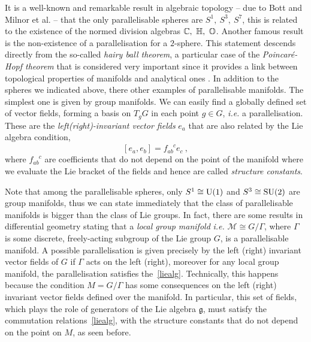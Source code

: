 \documentclass[debug]{phd}
\begin{document}
						It is a well-known and remarkable result in algebraic topology -- due to Bott and Milnor et al. \cite{bott, Kervaire} -- that the only parallelisable spheres are $S^1,\ S^3,\ S^7$, this is related to the existence of the normed division algebras $\mathbb{C},\ \mathbb{H},\ \mathbb{O}$. 
						Another famous result is the non-existence of a parallelisation for a $2$-sphere. 
						This statement descends directly from the so-called \emph{hairy ball theorem}, a particular case of the \emph{Poincaré-Hopf theorem} that is considered very important since it provides a link between topological properties of manifolds and analytical ones \cite{adams, Hairy}.
						In addition to the spheres we indicated above, there other examples of parallelisable manifolds. 
						The simplest one is given by group manifolds. 
						We can easily find a globally defined set of vector fields, forming a basis on $T_gG$ in each point $g \in G$, \emph{i.e.} a parallelisation. 
						These are the \emph{left(right)-invariant vector fields} $e_a$ that are also related by the Lie algebra condition,
							\begin{equation}
							\label{liealg}
								\left[e_a , e_b \right] = f_{ab}^{\phantom{ab}c}e_c\ ,
							\end{equation}
						where $f_{ab}^{\phantom{ab}c}$ are coefficients that do not depend on the point of the manifold where we evaluate the Lie bracket of the fields and hence are called \emph{structure constants}.
						
						Note that among the parallelisable spheres, only $S^1 \cong \mathrm{U}(1)$ and $S^3 \cong \mathrm{SU}(2)$ are group manifolds, thus we can state immediately that the class of parallelisable manifolds is bigger than the class of Lie groups. 
						In fact, there are some results in differential geometry stating that a \emph{local group manifold} \emph{i.e.} $ \mathcal{M} \cong G/\Gamma$, where $\Gamma$ is some discrete, freely-acting subgroup of the Lie group $G$, is a parallelisable manifold. 
						A possible parallelisation is given precisely by the left (right) invariant vector fields of $G$ if $\Gamma$ acts on the left (right), moreover for any local group manifold, the parallelisation satisfies the~\eqref{liealg}.
						Technically, this happens because the condition $M = G / \Gamma$ has some consequences on the left (right) invariant vector fields defined over the manifold. 
						In particular, this set of fields, which plays the role of generators of the Lie algebra $\mathfrak{g}$, must satisfy the commutation relations~\eqref{liealg}, with the structure constants that do not depend on the point on $M$, as seen before.
						
\end{document}
